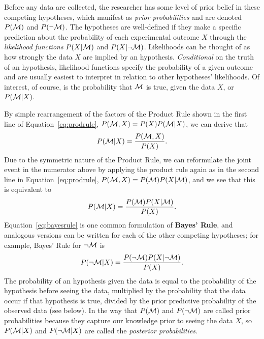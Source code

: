 Before any data are collected, the researcher has some level of prior belief in these competing hypotheses, which manifest as \textit{prior probabilities} and are denoted $P({\cal M})$ and $P(\neg{{\cal M}})$. The hypotheses are well-defined if they make a specific prediction about the probability of each experimental outcome $X$ through the \emph{likelihood functions} $P(X|{\cal M})$ and $P(X|\neg{\cal M})$. Likelihoods can be thought of as how strongly the data $X$ are implied by an hypothesis. \textit{Conditional} on the truth of an hypothesis, likelihood functions specify the probability of a given outcome and are usually easiest to interpret in relation to other hypotheses' likelihoods. Of interest, of course, is the probability that ${\cal M}$ is true, given the data $X$, or $P({\cal M}|X)$. 

By simple rearrangement of the factors of the Product Rule shown in the first line of Equation~\ref{eq:prodrule}, $P({\cal M},X)=P(X)P({\cal M}|X)$, we can derive that $$P({\cal M}|X) = \frac{P({\cal M},X)}{P(X)}.$$  Due to the symmetric nature of the Product Rule, we can reformulate the joint event in the numerator above by applying the product rule again as in the second line in Equation~\ref{eq:prodrule}, $P({\cal M},X)=P({\cal M})P(X|{\cal M})$, and we see that this is equivalent to
\begin{equation}
P({\cal M}|X) = \frac{P({\cal M})P(X|{\cal M})}{P(X)}.
\label{eq:bayesrule}
\end{equation}
Equation~\ref{eq:bayesrule} is one common formulation of \textbf{Bayes' Rule}, and analogous versions can be written for each of the other competing hypotheses; for example, Bayes' Rule for $\neg{\cal M}$ is $$P(\neg{\cal M}|X) = \frac{P(\neg{\cal M})P(X|\neg{\cal M})}{P(X)}.$$ The probability of an hypothesis given the data is equal to the probability of the hypothesis before seeing the data, multiplied by the probability that the data occur if that hypothesis is true, divided by the prior predictive probability of the observed data (see below). In the way that $P({\cal M})$ and $P(\neg{\cal M})$ are called prior probabilities because they capture our knowledge prior to seeing the data $X$, so $P({\cal M}|X)$ and $P(\neg{\cal M}|X)$ are called the \emph{posterior probabilities}. 

